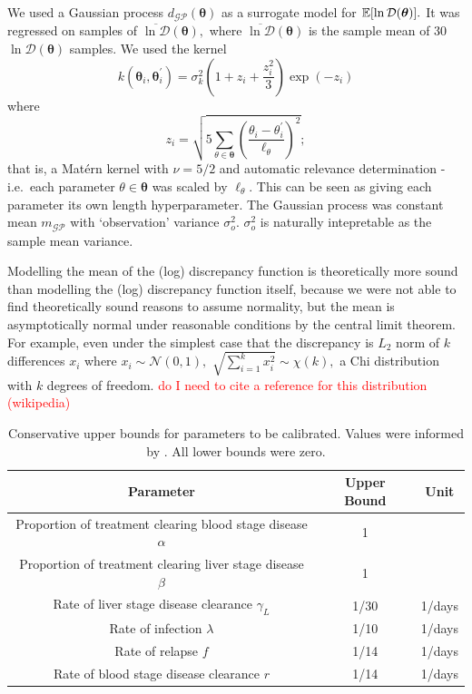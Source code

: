 We used a Gaussian process $d_\mathcal{GP}(\bm{\theta})$ as a surrogate model for
$\operatorname{\mathbb{E}}[\ln\mathcal{D}(\bm{\theta})].$ It was regressed on samples of
$\overline{\ln\mathcal{D}}(\bm{\theta}),$ where
$\overline{\ln\mathcal{D}}(\bm{\theta})$ is the sample mean of 30
$\ln\mathcal{D}(\bm{\theta})$ samples.
We used the kernel
$$
    k(\bm{\theta}_i, \bm{\theta}_i^\prime)
    = \sigma_k^2 (1 + z_i + \frac{z_i^2}{3})\exp(-z_i)
$$
where
$$
    z_i = \sqrt{
        5 \sum_{\theta\in \bm{\theta}}\left(
        \frac{\theta_i - \theta_i^\prime}{\ell_\theta}
        \right)^2
    };
$$ that is, a Mat\'ern kernel with $\nu = 5/2$ and automatic
relevance determination - i.e.\ each parameter $\theta\in\bm{\theta}$ was
scaled by $\ell_\theta.$ This can be seen as giving each parameter its own
length hyperparameter. The Gaussian process was constant mean $m_\mathcal{GP}$
with `observation' variance $\sigma^2_o.$ $\sigma^2_o$ is naturally
intepretable as the sample mean variance.

Modelling the mean of the (log) discrepancy function is theoretically more
sound than modelling the (log) discrepancy function itself, because
we were not able to find theoretically sound reasons to assume normality,
but the mean is asymptotically normal under reasonable conditions by the
central limit theorem. For example, even under the simplest case that the
discrepancy is $L_2$ norm of $k$ differences $x_i$ where
$x_i\sim\mathcal{N}(0, 1),$ $\sqrt{\sum_{i=1}^k x_i^2}\sim\chi(k),$ a Chi
distribution with $k$ degrees of freedom.
\textcolor{red}{
    do I need to cite a reference for this distribution (wikipedia)
}

\begin{table}[htbp]
    \centering
    \begin{tabular}{c |c |c}
        Parameter                                                     & Upper Bound & Unit   \\
        \hline
        Proportion of treatment clearing blood stage disease $\alpha$ & 1           &        \\
        Proportion of treatment clearing liver stage disease $\beta$  & 1           &        \\
        Rate of liver stage disease clearance $\gamma_L$              & 1/30        & 1/days \\
        Rate of infection $\lambda$                                   & 1/10        & 1/days \\
        Rate of relapse $f$                                           & 1/14        & 1/days \\
        Rate of blood stage disease clearance $r$                     & 1/14        & 1/days
    \end{tabular}
    \caption{
        Conservative upper bounds for parameters to be calibrated.
        Values were informed by
        \cite{champagne_using_2022, white_variation_2016}. All lower bounds
        were zero.
    }
    \label{table:param_bounds}
\end{table}


